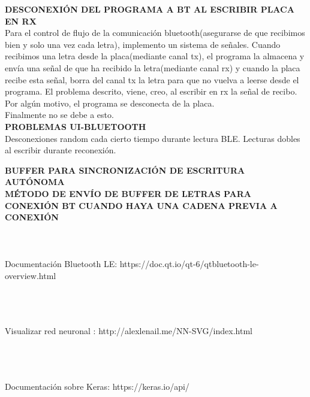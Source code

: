 \textbf{DESCONEXIÓN DEL PROGRAMA A BT AL ESCRIBIR PLACA EN RX}\\
Para el control de flujo de la comunicación bluetooth(asegurarse de que recibimos
bien y solo una vez cada letra), implemento un sistema de señales.
Cuando recibimos una letra desde la placa(mediante canal tx), el programa la almacena y
envía una señal de que ha recibido la letra(mediante canal rx) y cuando la placa
recibe esta señal, borra del canal tx la letra para que no vuelva a leerse desde el
programa.
El problema descrito, viene, creo, al escribir en rx la señal de recibo. Por algún
motivo, el programa se desconecta de la placa.\\Finalmente no se debe a esto.\\


\textbf{PROBLEMAS UI-BLUETOOTH}\\
Desconexiones random cada cierto tiempo durante lectura BLE.
Lecturas dobles al escribir durante reconexión.

\textbf{BUFFER PARA SINCRONIZACIÓN DE ESCRITURA AUTÓNOMA}\\

\textbf{MÉTODO DE ENVÍO DE BUFFER DE LETRAS PARA CONEXIÓN BT CUANDO HAYA UNA CADENA
PREVIA A CONEXIÓN}\\

~\\~\\~\\Documentación Bluetooth LE:
https://doc.qt.io/qt-6/qtbluetooth-le-overview.html

~\\~\\~\\Visualizar red neuronal :
http://alexlenail.me/NN-SVG/index.html

~\\~\\~\\Documentación sobre Keras:
https://keras.io/api/

